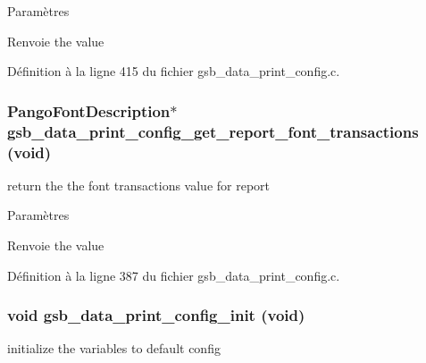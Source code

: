 \begin{DoxyParams}{Paramètres}
\item[{\em }]\end{DoxyParams}
\begin{DoxyReturn}{Renvoie}
the value 
\end{DoxyReturn}


Définition à la ligne 415 du fichier gsb\_\-data\_\-print\_\-config.c.

\subsubsection[{gsb\_\-data\_\-print\_\-config\_\-get\_\-report\_\-font\_\-transactions}]{\setlength{\rightskip}{0pt plus 5cm}PangoFontDescription$\ast$ gsb\_\-data\_\-print\_\-config\_\-get\_\-report\_\-font\_\-transactions (void)}\label{gsb__data__print__config_8h_a6adfdd58927d0c92a60106bcb1a94536}
return the the font transactions value for report


\begin{DoxyParams}{Paramètres}
\item[{\em }]\end{DoxyParams}
\begin{DoxyReturn}{Renvoie}
the value 
\end{DoxyReturn}


Définition à la ligne 387 du fichier gsb\_\-data\_\-print\_\-config.c.

\subsubsection[{gsb\_\-data\_\-print\_\-config\_\-init}]{\setlength{\rightskip}{0pt plus 5cm}void gsb\_\-data\_\-print\_\-config\_\-init (void)}\label{gsb__data__print__config_8h_ac41ddc7fc1b56a817f79bcab5de201ac}
initialize the variables to default config


